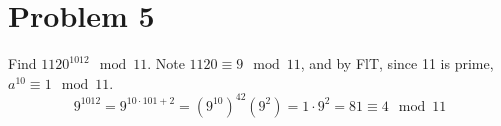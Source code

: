 \documentclass[12pt]{article}
\begin{document}
\section{Problem 5}
Find $1120^{1012}\mod{11}$.
\newline Note $1120\equiv9\mod{11}$, and by FlT, since 11 is prime, $a^{10}\equiv1\mod{11}$. $$9^{1012}=9^{10\cdot101+2}=(9^{10})^{42}(9^2)=1\cdot9^2=81\equiv4\mod{11}$$
\end{document}
